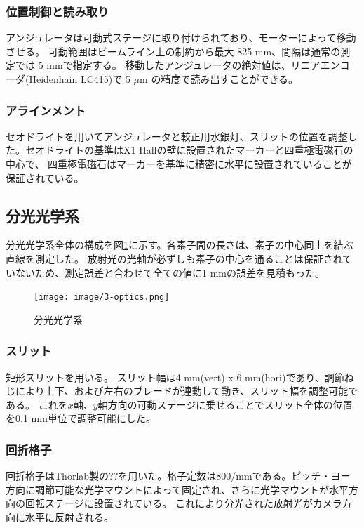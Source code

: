 \documentclass[a4paper,11pt,uplatex]{jsbook}
\begin{document}
\subsubsection{位置制御と読み取り}
アンジュレータは可動式ステージに取り付けられており、モーターによって移動させる。
可動範囲はビームライン上の制約から最大 825 mm、間隔は通常の測定では 5 mmで指定する。
移動したアンジュレータの絶対値は、リニアエンコーダ(Heidenhain LC415)で 5 $\mu \text{m}$ の精度で読み出すことができる。
\subsubsection{アラインメント}
セオドライトを用いてアンジュレータと較正用水銀灯、スリットの位置を調整した。セオドライトの基準はX1 Hallの壁に設置されたマーカーと四重極電磁石の中心で、
四重極電磁石はマーカーを基準に精密に水平に設置されていることが保証されている。

\subsection{分光光学系}
分光光学系全体の構成を図\ref{fig:optics}に示す。各素子間の長さは、素子の中心同士を結ぶ直線を測定した。
放射光の光軸が必ずしも素子の中心を通ることは保証されていないため、測定誤差と合わせて全ての値に1 mmの誤差を見積もった。
\begin{figure}
  \centering
  \texttt{[image: image/3-optics.png]}\\
  \caption{分光光学系}
  \label{fig:optics}
\end{figure}

\subsubsection{スリット}
矩形スリットを用いる。
スリット幅は4 mm(vert) x 6 mm(hori)であり、調節ねじにより上下、および左右のブレードが連動して動き、スリット幅を調整可能である。
これを$x$軸、$y$軸方向の可動ステージに乗せることでスリット全体の位置を0.1 mm単位で調整可能にした。

\subsubsection{回折格子}
回折格子はThorlab製の??を用いた。格子定数は800/mmである。ピッチ・ヨー方向に調節可能な光学マウントによって固定され、さらに光学マウントが水平方向の回転ステージに設置されている。
これにより分光された放射光がカメラ方向に水平に反射される。
\end{document}

